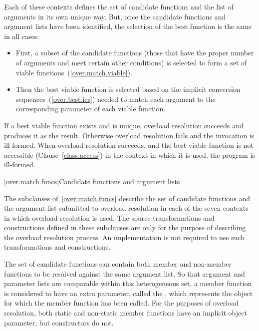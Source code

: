 Each of these contexts defines the set of candidate functions and
the list of arguments in its own unique way.
But, once the
candidate functions and argument lists have been identified, the
selection of the best function is the same in all cases:

\begin{itemize}
\item
First, a subset of the candidate functions (those that have
the proper number of arguments and meet certain other
conditions) is selected to form a set of
%
viable functions~(\ref{over.match.viable}).
\item
Then the best viable function is selected based on the
implicit conversion sequences~(\ref{over.best.ics}) needed to
match each argument to the corresponding parameter of each
viable function.
\end{itemize}

\pnum
If a best viable function exists and is unique, overload
resolution succeeds and produces it as the result.
Otherwise
overload resolution fails and the invocation is ill-formed.
When overload resolution succeeds,
and the best viable function is not accessible (Clause~\ref{class.access}) in the context
in which it is used,
the program is ill-formed.

[over.match.funcs]{Candidate functions and argument lists}%
%

\pnum
The subclauses of~\ref{over.match.funcs} describe
the set of candidate functions and the argument list submitted to
overload resolution in each of the seven contexts in which
overload resolution is used.
The source transformations and constructions defined
in these subclauses are only for the purpose of describing the
overload resolution process.
An implementation is not required
to use such transformations and constructions.

\pnum
{}%
%
The set of candidate functions can contain both member and non-member
functions to be resolved against the same argument list.
So that argument and parameter lists are comparable within this
heterogeneous set, a member function is considered to have an
extra parameter, called the
,
which represents the object for which the member function has been
called.
For the purposes of overload resolution, both static and
non-static member functions have an implicit object parameter,
but constructors do not.

